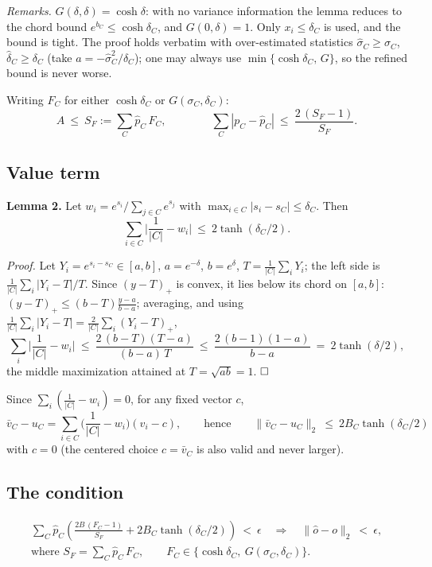 \emph{Remarks.} $G(\delta,\delta) = \cosh\delta$: with no variance information the
lemma reduces to the chord bound $e^{b_C} \le \cosh\delta_C$, and $G(0,\delta) = 1$.
Only $x_i \le \delta_C$ is used, and the bound is tight. The proof holds verbatim with
over-estimated statistics $\hat\sigma_C \ge \sigma_C$, $\hat\delta_C \ge \delta_C$
(take $a = -\hat\sigma_C^2/\hat\delta_C$); one may always use
$\min\{\cosh\delta_C,\, G\}$, so the refined bound is never worse.

Writing $F_C$ for either $\cosh\delta_C$ or $G(\sigma_C,\delta_C)$:
\[
A \ \le\ S_F := \sum_C \hat p_C\, F_C ,
\qquad\qquad
\sum_C |p_C - \hat p_C| \ \le\ \frac{2\,(S_F - 1)}{S_F} .
\]

\subsection{Value term}

\begin{tcolorbox}[colback=white, colframe=black, arc=0mm, boxrule=0.5pt]
\textbf{Lemma 2.} Let $w_i = e^{s_i} / \sum_{j\in C} e^{s_j}$ with
$\max_{i\in C}|s_i - s_C| \le \delta_C$. Then
\[
\sum_{i\in C} \Big| \frac{1}{|C|} - w_i \Big| \ \le\ 2 \tanh(\delta_C/2).
\]
\end{tcolorbox}

\emph{Proof.} Let $Y_i = e^{s_i - s_C} \in [a, b]$, $a = e^{-\delta}$,
$b = e^{\delta}$, $T = \frac{1}{|C|}\sum_i Y_i$; the left side is
$\frac{1}{|C|}\sum_i |Y_i - T| / T$. Since $(y-T)_+$ is convex, it lies below its
chord on $[a,b]$: $(y-T)_+ \le (b-T)\frac{y-a}{b-a}$; averaging, and using
$\frac{1}{|C|}\sum_i |Y_i - T| = \frac{2}{|C|}\sum_i (Y_i - T)_+$,
\[
\sum_{i} \Big| \frac{1}{|C|} - w_i \Big|
\ \le\ \frac{2\,(b-T)(T-a)}{(b-a)\,T}
\ \le\ \frac{2\,(b-1)(1-a)}{b-a}
\ =\ 2\tanh(\delta/2),
\]
the middle maximization attained at $T = \sqrt{ab} = 1$. $\hfill\square$

Since $\sum_i (\frac{1}{|C|} - w_i) = 0$, for any fixed vector $c$,
\[
\bar v_C - u_C = \sum_{i\in C} \Big(\frac{1}{|C|} - w_i\Big) (v_i - c),
\qquad\text{hence}\qquad
\|\bar v_C - u_C\|_2 \ \le\ 2 B_C \tanh(\delta_C/2)
\]
with $c = 0$ (the centered choice $c = \bar v_C$ is also valid and never larger).

\subsection{The condition}

\begin{tcolorbox}[colback=white, colframe=black, arc=0mm, boxrule=0.5pt]
\begin{gather*}
\sum_{C} \hat p_{C}\left(
\frac{2B\,(F_C - 1)}{S_F}
+ 2 B_C \tanh(\delta_C/2)\right) \ <\ \epsilon
\quad\Longrightarrow\quad
\|\hat o - o\|_2 \ <\ \epsilon,
\\[4pt]
\text{where } S_F = \sum_{C} \hat p_C\, F_C,
\qquad F_C \in \{\cosh\delta_C,\ G(\sigma_C,\delta_C)\}.
\end{gather*}
\end{tcolorbox}

